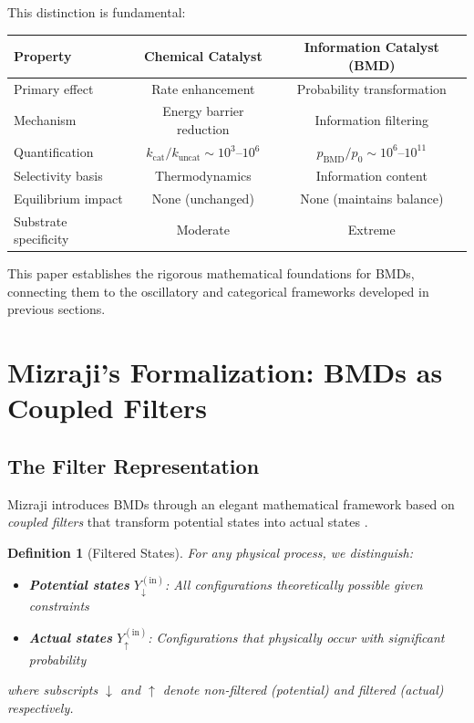 \documentclass[11pt]{article}
\newtheorem{definition}[theorem]{Definition}
\theoremstyle{remark}
\begin{document}
This distinction is fundamental:

\begin{center}
\begin{tabular}{lcc}
\toprule
\textbf{Property} & \textbf{Chemical Catalyst} & \textbf{Information Catalyst (BMD)} \\
\midrule
Primary effect & Rate enhancement & Probability transformation \\
Mechanism & Energy barrier reduction & Information filtering \\
Quantification & $k_{\text{cat}}/k_{\text{uncat}} \sim 10^3$--$10^6$ & $p_{\text{BMD}}/p_0 \sim 10^6$--$10^{11}$ \\
Selectivity basis & Thermodynamics & Information content \\
Equilibrium impact & None (unchanged) & None (maintains balance) \\
Substrate specificity & Moderate & Extreme \\
\bottomrule
\end{tabular}
\end{center}

This paper establishes the rigorous mathematical foundations for BMDs, connecting them to the oscillatory and categorical frameworks developed in previous sections.

\section{Mizraji's Formalization: BMDs as Coupled Filters}

\subsection{The Filter Representation}

Mizraji introduces BMDs through an elegant mathematical framework based on \textit{coupled filters} that transform potential states into actual states \cite{mizraji2021biological}.

\begin{definition}[Filtered States]
\label{def:filtered_states}
For any physical process, we distinguish:
\begin{itemize}
\item \textbf{Potential states} $Y_{\downarrow}^{(\text{in})}$: All configurations theoretically possible given constraints
\item \textbf{Actual states} $Y_{\uparrow}^{(\text{in})}$: Configurations that physically occur with significant probability
\end{itemize}
where subscripts $\downarrow$ and $\uparrow$ denote non-filtered (potential) and filtered (actual) respectively.
\end{definition}
\end{document}
